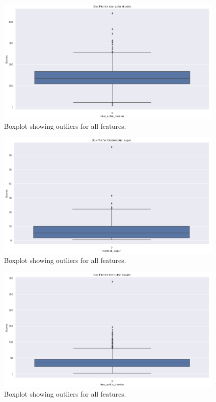 \begin{figure}[H]
\centering
        \includegraphics[totalheight=8cm]{images/boxplot-total_sulfor_dioxide.png}
    \caption{Boxplot showing outliers for all features.}
    \label{fig:boxplot-total_sulfor_dioxide}
\end{figure}

\begin{figure}[H]
\centering
        \includegraphics[totalheight=8cm]{images/boxplot-total_residual_sugar.png}
    \caption{Boxplot showing outliers for all features.}
    \label{fig:boxplot-total_residual_sugar}
\end{figure}

\begin{figure}[H]
\centering
        \includegraphics[totalheight=8cm]{images/boxplot-free_sulfor_dioxide.png}
    \caption{Boxplot showing outliers for all features.}
    \label{fig:boxplot-free_sulfor_dioxide}
\end{figure}

